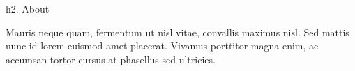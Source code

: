 h2. About

Mauris neque quam, fermentum ut nisl vitae, convallis maximus nisl. Sed mattis nunc id lorem euismod amet placerat. Vivamus porttitor magna enim, ac accumsan tortor cursus at phasellus sed ultricies.